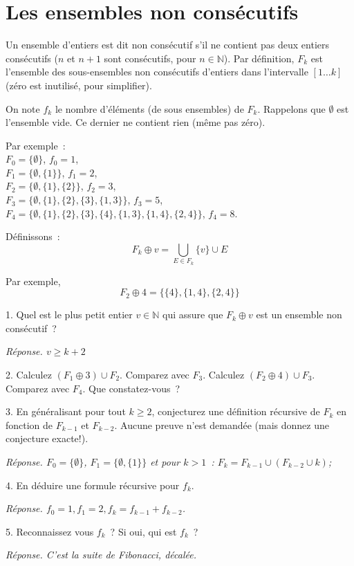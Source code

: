 \documentclass[11pt]{article}
\def\N{\mathbb N}
\begin{document}
{
\section{Les ensembles non consécutifs}
Un ensemble d'entiers est dit non consécutif s'il ne contient pas deux entiers consécutifs ($n$ et $n+1$ sont consécutifs, pour $n\in \N$). 
Par définition, $F_k$ est l'ensemble des sous-ensembles  non consécutifs d'entiers dans l'intervalle $[1 \ldots k]$ (zéro est inutilisé, pour simplifier). 

On note $f_k$ le nombre d'éléments (de sous ensembles) de $F_k$. Rappelons que $\emptyset$ est l'ensemble vide. Ce dernier ne contient rien (même pas zéro).

Par exemple~: \\
\indent $F_0=\{ \emptyset \}$,  $f_0=1 $, \\
\indent $F_1= \{ \emptyset, \{1\}\}$, $f_1= 2$,\\
\indent $F_2= \{ \emptyset, \{1\}, \{2\} \}$, $f_2=3$,\\
\indent $F_3= \{ \emptyset, \{1\}, \{2\}, \{3\}, \{1, 3\}\}$, $f_3=5 $,\\
\indent $F_4= \{ \emptyset, \{1\}, \{2\}, \{3\}, \{4\},  \{1, 3\}, \{1, 4\}, \{2, 4 \}\}$, $f_4=8$.

Définissons~:
$$F_k \oplus v= \bigcup_{E\in F_k} \{v\} \cup E$$ 

Par exemple, 
$$F_2 \oplus 4= \{ \{4\}, \{1,4\},  \{2, 4\}  \}$$

1. Quel est le plus petit entier $v\in \N$ qui assure que  $F_k \oplus v$ est un ensemble non consécutif~?

\ifcorrige

\medskip
{\it  Réponse.
$v \ge k+2$
}
\medskip

\else
\fi

2. Calculez $(F_1 \oplus 3) \cup F_2$.
Comparez avec $F_3$.
Calculez $(F_2 \oplus 4)  \cup F_3$.
Comparez avec $F_4$.
Que constatez-vous~?

3.
En généralisant pour tout  $k\ge 2$, conjecturez une  définition récursive de $F_k$ en fonction de $F_{k-1}$ et $F_{k-2}$.
Aucune preuve n'est demandée (mais donnez une conjecture exacte!).


\ifcorrige

\medskip

{\it  Réponse.
$F_0= \{ \emptyset \}$, $F_1= \{ \emptyset, \{1\}\}$ et pour  $k>1$~:
$F_k= F_{k-1} \cup (F_{k-2}\cup k)$;
}
\medskip


\else
\fi

4. En déduire une formule récursive pour $f_k$.

\ifcorrige

\medskip

{\it  Réponse.
$f_0=1, f_1=2, f_k= f_{k-1} + f_{k-2}$.
}
\medskip


\else
\fi

5. Reconnaissez vous $f_k$~? Si oui, qui est $f_k$~?

\ifcorrige

\medskip

{\it  Réponse.
C'est la suite de Fibonacci, décalée.
}
\medskip


\else
\fi 
}
\end{document}

